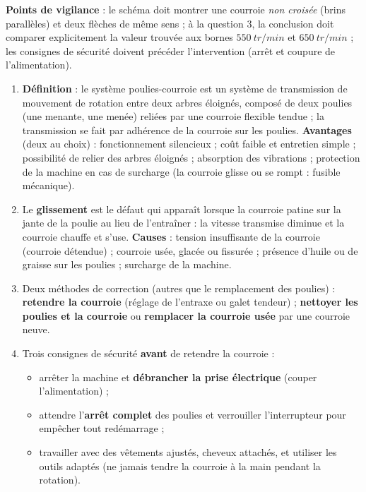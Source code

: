 \documentclass[11pt]{article}
\begin{document}
\begin{corrige}
\textbf{Points de vigilance} : le schéma doit montrer une courroie \emph{non croisée} (brins parallèles) et deux flèches de même sens ; à la question 3, la conclusion doit comparer explicitement la valeur trouvée aux bornes $\SI{550}{tr/min}$ et $\SI{650}{tr/min}$ ; les consignes de sécurité doivent précéder l'intervention (arrêt et coupure de l'alimentation).
\end{corrige}

\begin{corrige}
\begin{enumerate}
\item \textbf{Définition} : le système poulies-courroie est un système de transmission de mouvement de rotation entre deux arbres éloignés, composé de deux poulies (une menante, une menée) reliées par une courroie flexible tendue ; la transmission se fait par adhérence de la courroie sur les poulies. \textbf{Avantages} (deux au choix) : fonctionnement silencieux ; coût faible et entretien simple ; possibilité de relier des arbres éloignés ; absorption des vibrations ; protection de la machine en cas de surcharge (la courroie glisse ou se rompt : fusible mécanique).
\item Le \textbf{glissement} est le défaut qui apparaît lorsque la courroie patine sur la jante de la poulie au lieu de l'entraîner : la vitesse transmise diminue et la courroie chauffe et s'use. \textbf{Causes} : tension insuffisante de la courroie (courroie détendue) ; courroie usée, glacée ou fissurée ; présence d'huile ou de graisse sur les poulies ; surcharge de la machine.
\item Deux méthodes de correction (autres que le remplacement des poulies) : \textbf{retendre la courroie} (réglage de l'entraxe ou galet tendeur) ; \textbf{nettoyer les poulies et la courroie} ou \textbf{remplacer la courroie usée} par une courroie neuve.
\item Trois consignes de sécurité \textbf{avant} de retendre la courroie :
\begin{itemize}
\item arrêter la machine et \textbf{débrancher la prise électrique} (couper l'alimentation) ;
\item attendre l'\textbf{arrêt complet} des poulies et verrouiller l'interrupteur pour empêcher tout redémarrage ;
\item travailler avec des vêtements ajustés, cheveux attachés, et utiliser les outils adaptés (ne jamais tendre la courroie à la main pendant la rotation).

\end{itemize}
\end{enumerate}
\end{corrige}
\end{document}
